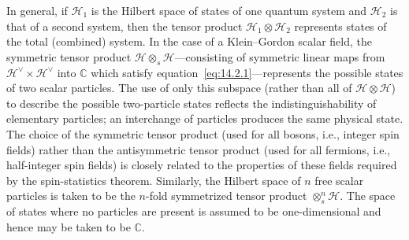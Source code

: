 In general, if \(\mathcal H_1\) is the Hilbert space of states of one quantum system
and \(\mathcal H_2\) is that of a second system, then the tensor product
\(\mathcal H_1\otimes\mathcal H_2\) represents states of the total (combined)
system. In the case of a Klein--Gordon scalar field, the symmetric tensor product
\(\mathcal H\otimes_s\mathcal H\)---consisting of symmetric linear maps from
\(\mathcal H^\vee\times\mathcal H^\vee\) into \(\mathbb C\) which satisfy
equation~\eqref{eq:14.2.1}---represents the possible states of two scalar particles.
The use of only this subspace (rather than all of
\(\mathcal H\otimes\mathcal H\)) to describe the possible two-particle states
reflects the indistinguishability of elementary particles; an interchange of particles
produces the same physical state. The choice of the symmetric tensor product (used
for all bosons, i.e., integer spin fields) rather than the antisymmetric tensor product
(used for all fermions, i.e., half-integer spin fields) is closely related to the properties
of these fields required by the spin-statistics theorem. Similarly, the Hilbert space
of \(n\) free scalar particles is taken to be the \(n\)-fold symmetrized tensor product
\(\otimes_s^n\mathcal H\). The space of states where no particles are present is
assumed to be one-dimensional and hence may be taken to be \(\mathbb C\).

